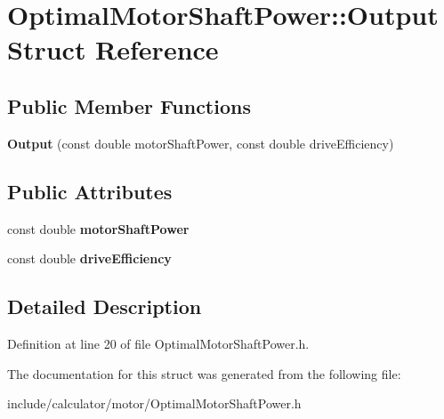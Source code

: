 \hypertarget{struct_optimal_motor_shaft_power_1_1_output}{}\section{Optimal\+Motor\+Shaft\+Power\+:\+:Output Struct Reference}
\label{struct_optimal_motor_shaft_power_1_1_output}
\subsection*{Public Member Functions}
\begin{DoxyCompactItemize}
\item 
\mbox{\label{struct_optimal_motor_shaft_power_1_1_output_a8e1cae3343d3d6753e08720957b6100a}} 
{\bfseries Output} (const double motor\+Shaft\+Power, const double drive\+Efficiency)
\end{DoxyCompactItemize}
\subsection*{Public Attributes}
\begin{DoxyCompactItemize}
\item 
\mbox{\label{struct_optimal_motor_shaft_power_1_1_output_ae2a70b8119760c1542d3c14bfb07458d}} 
const double {\bfseries motor\+Shaft\+Power}
\item 
\mbox{\label{struct_optimal_motor_shaft_power_1_1_output_a9764d33f91711db8286f7ef26ebe9245}} 
const double {\bfseries drive\+Efficiency}
\end{DoxyCompactItemize}


\subsection{Detailed Description}


Definition at line 20 of file Optimal\+Motor\+Shaft\+Power.\+h.



The documentation for this struct was generated from the following file\+:\begin{DoxyCompactItemize}
\item 
include/calculator/motor/Optimal\+Motor\+Shaft\+Power.\+h\end{DoxyCompactItemize}
